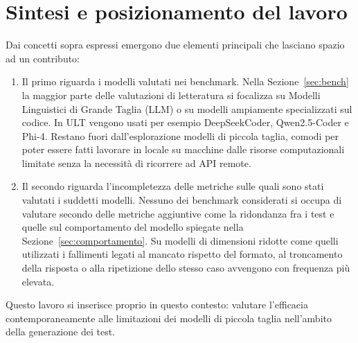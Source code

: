 \section{Sintesi e posizionamento del lavoro}
\label{sec:posizionamento}
Dai concetti sopra espressi emergono due elementi principali che lasciano spazio ad un contributo:
\begin{enumerate}
  \item Il primo riguarda i modelli valutati nei benchmark. Nella Sezione~\ref{sec:bench} la maggior parte delle valutazioni di letteratura si focalizza su Modelli Linguistici di Grande Taglia (LLM) o su modelli ampiamente specializzati sul codice. In ULT \cite{huang2025ult} vengono usati per esempio DeepSeekCoder, Qwen2.5-Coder e Phi-4. Restano fuori dall'esplorazione modelli di piccola taglia, comodi per poter essere fatti lavorare in locale su macchine dalle risorse computazionali limitate senza la necessità di ricorrere ad API remote.
  \item Il secondo riguarda l'incompletezza delle metriche sulle quali sono stati valutati i suddetti modelli. Nessuno dei benchmark considerati si occupa di valutare secondo delle metriche aggiuntive come la ridondanza fra i test e quelle sul comportamento del modello spiegate nella Sezione~\ref{sec:comportamento}. Su modelli di dimensioni ridotte come quelli utilizzati i fallimenti legati al mancato rispetto del formato, al troncamento della risposta o alla ripetizione dello stesso caso avvengono con frequenza più elevata.
\end{enumerate}
Questo lavoro si inserisce proprio in questo contesto: valutare l'efficacia contemporaneamente alle limitazioni dei modelli di piccola taglia nell'ambito della generazione dei test.



